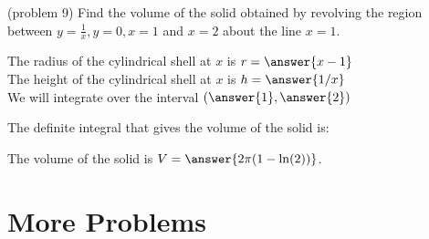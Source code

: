 \documentclass[handout]{ximera}
\begin{document}
\begin{problem}(problem 9)
Find the volume of the solid obtained by revolving the region between $y= \frac{1}{x}, y = 0, x = 1$ and $x=2$ about the line $x = 1$.


The radius of the cylindrical shell at $x$ is $r = \answer{x-1}$\\
The height of the cylindrical shell at $x$ is $h = \answer{1/x}$\\

We will integrate over the interval $\left(\answer{1},\answer{2}\right)$

The definite integral that gives the volume of the solid is:\\
\begin{multipleChoice}
\end{multipleChoice}

The volume of the solid is $V = \answer{2\pi(1-\ln(2)) }$.

\end{problem}

\begin{center}
\begin{foldable}
\end{foldable}
\end{center}



\section{More Problems}
\end{document}
